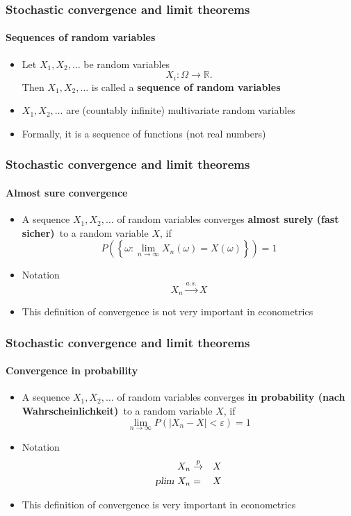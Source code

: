 \documentclass[notes=show]{beamer}
\begin{document}
\begin{frame}\frametitle{Stochastic convergence and limit theorems}\framesubtitle{Sequences of random variables}
\begin{itemize}
    \item Let $X_{1},X_{2},\ldots $ be random variables
        \begin{equation*}
            X_{i}:\Omega \rightarrow \mathbb{R.}
        \end{equation*}
        Then $X_{1},X_{2},\ldots $ is called a \textbf{sequence of random variables}
    \item $X_{1},X_{2},\ldots $ are (countably infinite) multivariate random variables
    \item Formally, it is a sequence of functions (not real numbers)
\end{itemize}
\end{frame}


\begin{frame}\frametitle{Stochastic convergence and limit theorems}\framesubtitle{Almost sure convergence}
\begin{itemize}
    \item A sequence $X_{1},X_{2},\ldots $ of random variables converges \newline \textbf{almost surely (fast sicher)}\emph{\ }to a random variable $X$, if
        \begin{equation*}
            P\left( \left\{ \omega :\lim_{n\rightarrow \infty }X_{n}(\omega )=X(\omega)\right\} \right) =1
        \end{equation*}
    \item Notation
    \begin{equation*}
        X_{n}\overset{a.s.}{\rightarrow }X
    \end{equation*}
\item This definition of convergence is not very important in econometrics
\end{itemize}
\end{frame}


\begin{frame}\frametitle{Stochastic convergence and limit theorems}\framesubtitle{Convergence in probability}
\begin{itemize}
    \item A sequence $X_{1},X_{2},\ldots $ of random variables converges \newline \textbf{in probability (nach Wahrscheinlichkeit)}\emph{\ }to a random variable $X$, if
        \begin{equation*}
            \lim_{n\rightarrow \infty }P\left( |X_{n}-X|<\varepsilon \right) =1
        \end{equation*}
    \item Notation
        \begin{eqnarray*}
            X_{n} &\overset{p}{\rightarrow }&X \\
            \textsl{plim}~X_{n} &=&X
        \end{eqnarray*}
    \item This definition of convergence is very important in econometrics
\end{itemize}
\end{frame}
\end{document}
